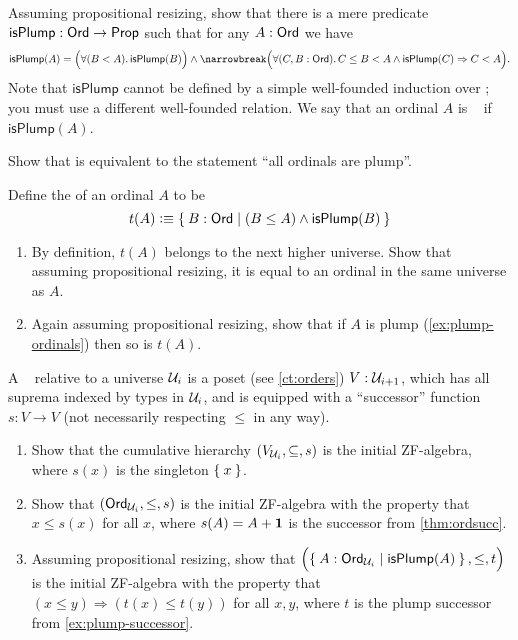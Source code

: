 \begin{ex}\label{ex:plump-ordinals}
  Assuming propositional resizing, show that there is a mere predicate $\mathsf{isPlump}:\mathsf{Ord}\to\mathsf{Prop}$ such that for any $A:\mathsf{Ord}$ we have
  \begin{multline*}\label{eq:plump}
    \mathsf{isPlump}(A) = \Parens{\fall{B<A} \mathsf{isPlump}(B)} \wedge\narrowbreak
    \Parens{\fall{C,B:\ord} C\le B < A \wedge \mathsf{isPlump}(C) \Rightarrow C < A}.
  \end{multline*}
  Note that $\mathsf{isPlump}$ cannot be defined by a simple well-founded induction over \ord; you must use a different well-founded relation.
  We say that an ordinal $A$ is ~\cite{taylor:ordinals,Taylor99} if $\mathsf{isPlump}(A)$.
\end{ex}

\begin{ex}\label{ex:not-plump}
  Show that \LEM{} is equivalent to the statement ``all ordinals are plump''.
\end{ex}

\begin{ex}\label{ex:plump-successor}
  Define the  of an ordinal $A$ to be
  \[ t(A) \defeq \setof{ B:\ord | (B\le A) \wedge \mathsf{isPlump}(B) } \]
  \begin{enumerate}
  \item By definition, $t(A)$ belongs to the next higher universe.
    Show that assuming propositional resizing, it is equal to an ordinal in the same universe as $A$.
  \item Again assuming propositional resizing, show that if $A$ is plump (\cref{ex:plump-ordinals}) then so is $t(A)$.
  \end{enumerate}
\end{ex}

\begin{ex}\label{ex:ZF-algebras}
  A ~\cite{JoyalMoerdijk1995}
  relative to a universe $\mathcal{U}_i$ is a poset (see \cref{ct:orders}) $V:\mathcal{U}_{i+1}$, which has all suprema indexed by types in $\mathcal{U}_i$, and is equipped with a ``successor'' function $s:V\to V$ (not necessarily respecting $\le$ in any way).
  \begin{enumerate}
  \item Show that the cumulative hierarchy $(V_{\mathcal{U}_i},\subseteq,s)$ is the initial ZF-algebra, where $s(x)$ is the singleton $\Set{x}$.
  \item Show that $(\mathsf{Ord}_{\mathcal{U}_i},\le,s)$ is the initial ZF-algebra with the property that $x\le s(x)$ for all $x$, where $s(A)=A+\mathbf{1}$ is the successor from \cref{thm:ordsucc}.
  \item Assuming propositional resizing, show that $\Parens{\setof{A:\ord_{\UU_i} | \mathsf{isPlump}(A) },\le,t}$ is the initial ZF-algebra with the property that $(x\le y) \Rightarrow (t(x)\le t(y))$ for all $x,y$, where $t$ is the plump successor from \cref{ex:plump-successor}.
  \end{enumerate}
\end{ex}

%

